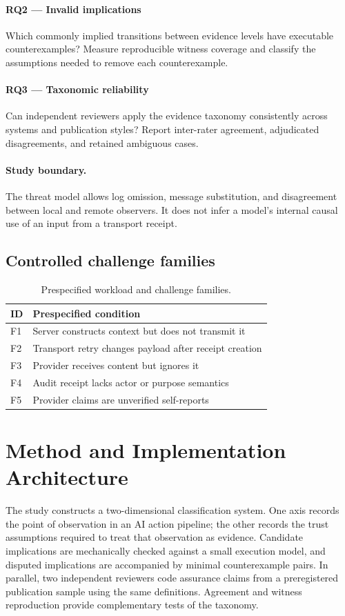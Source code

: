 \documentclass[11pt,a4paper]{article}
\begin{document}
\paragraph{RQ2 — Invalid implications} Which commonly implied transitions between evidence levels have executable counterexamples? Measure reproducible witness coverage and classify the assumptions needed to remove each counterexample.

\paragraph{RQ3 — Taxonomic reliability} Can independent reviewers apply the evidence taxonomy consistently across systems and publication styles? Report inter-rater agreement, adjudicated disagreements, and retained ambiguous cases.

\paragraph{Study boundary.} The threat model allows log omission, message substitution, and disagreement between local and remote observers. It does not infer a model’s internal causal use of an input from a transport receipt.

\subsection{Controlled challenge families}
\begin{table}[ht]
\centering\small
\caption{Prespecified workload and challenge families.}
\begin{tabularx}{\linewidth}{@{}lX@{}}\toprule
ID & Prespecified condition \\ \midrule
F1 & Server constructs context but does not transmit it \\ 
F2 & Transport retry changes payload after receipt creation \\ 
F3 & Provider receives content but ignores it \\ 
F4 & Audit receipt lacks actor or purpose semantics \\ 
F5 & Provider claims are unverified self-reports \\ 
\bottomrule\end{tabularx}\end{table}

\section{Method and Implementation Architecture}
The study constructs a two-dimensional classification system. One axis records the point of observation in an AI action pipeline; the other records the trust assumptions required to treat that observation as evidence. Candidate implications are mechanically checked against a small execution model, and disputed implications are accompanied by minimal counterexample pairs. In parallel, two independent reviewers code assurance claims from a preregistered publication sample using the same definitions. Agreement and witness reproduction provide complementary tests of the taxonomy.
\end{document}
